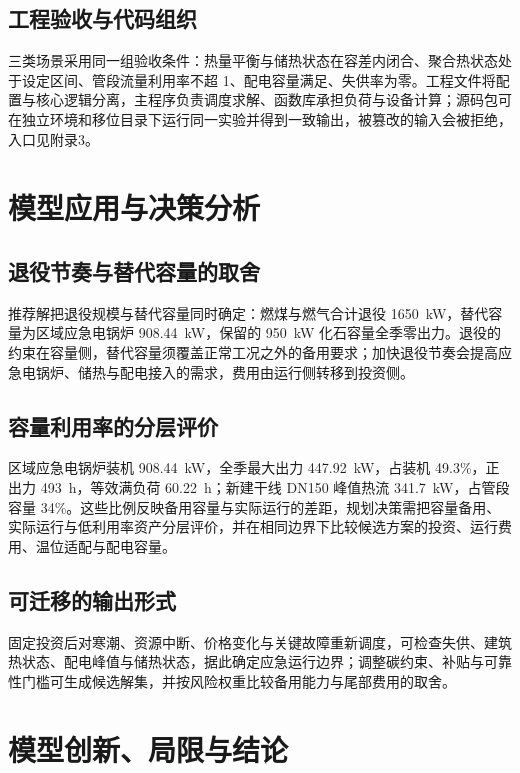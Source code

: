 \documentclass[12pt,a4paper]{article}
\begin{document}
\subsection{工程验收与代码组织}

三类场景采用同一组验收条件：热量平衡与储热状态在容差内闭合、聚合热状态处于设定区间、管段流量利用率不超 1、配电容量满足、失供率为零。工程文件将配置与核心逻辑分离，主程序负责调度求解、函数库承担负荷与设备计算；源码包可在独立环境和移位目录下运行同一实验并得到一致输出，被篡改的输入会被拒绝，入口见附录3。
\clearpage
\section{模型应用与决策分析}\label{minor:application}

\subsection{退役节奏与替代容量的取舍}

推荐解把退役规模与替代容量同时确定：燃煤与燃气合计退役 1650~kW，替代容量为区域应急电锅炉 908.44~kW，保留的 950~kW 化石容量全季零出力。退役的约束在容量侧，替代容量须覆盖正常工况之外的备用要求；加快退役节奏会提高应急电锅炉、储热与配电接入的需求，费用由运行侧转移到投资侧。

\subsection{容量利用率的分层评价}

区域应急电锅炉装机 908.44~kW，全季最大出力 447.92~kW，占装机 49.3\%，正出力 493~h，等效满负荷 60.22~h；新建干线 DN150 峰值热流 341.7~kW，占管段容量 34\%。这些比例反映备用容量与实际运行的差距，规划决策需把容量备用、实际运行与低利用率资产分层评价，并在相同边界下比较候选方案的投资、运行费用、温位适配与配电容量。

\subsection{可迁移的输出形式}

固定投资后对寒潮、资源中断、价格变化与关键故障重新调度，可检查失供、建筑热状态、配电峰值与储热状态，据此确定应急运行边界；调整碳约束、补贴与可靠性门槛可生成候选解集，并按风险权重比较备用能力与尾部费用的取舍。

\clearpage
\section{模型创新、局限与结论}\label{minor:conclusion}
\end{document}
